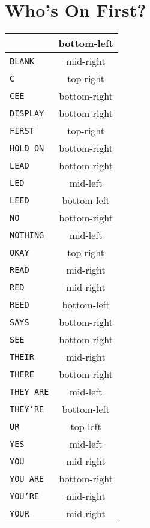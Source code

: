 \documentclass[11pt]{amsart}
\begin{document}
\section{Who's On First?}

\begin{tabular}{|l|c|}
\hline
\texttt{}         & bottom-left  \\ \hline
\texttt{BLANK}    & mid-right    \\ \hline
\texttt{C}        & top-right    \\ \hline
\texttt{CEE}      & bottom-right \\ \hline
\texttt{DISPLAY}  & bottom-right \\ \hline
\texttt{FIRST}    & top-right    \\ \hline
\texttt{HOLD ON}  & bottom-right \\ \hline
\texttt{LEAD}     & bottom-right \\ \hline
\texttt{LED}      & mid-left     \\ \hline
\texttt{LEED}     & bottom-left  \\ \hline
\texttt{NO}       & bottom-right \\ \hline
\texttt{NOTHING}  & mid-left     \\ \hline
\texttt{OKAY}     & top-right    \\ \hline
\texttt{READ}     & mid-right    \\ \hline
\texttt{RED}      & mid-right    \\ \hline
\texttt{REED}     & bottom-left  \\ \hline
\texttt{SAYS}     & bottom-right \\ \hline
\texttt{SEE}      & bottom-right \\ \hline
\texttt{THEIR}    & mid-right    \\ \hline
\texttt{THERE}    & bottom-right \\ \hline
\texttt{THEY ARE} & mid-left     \\ \hline
\texttt{THEY'RE}  & bottom-left  \\ \hline
\texttt{UR}       & top-left     \\ \hline
\texttt{YES}      & mid-left     \\ \hline
\texttt{YOU}      & mid-right    \\ \hline
\texttt{YOU ARE}  & bottom-right \\ \hline
\texttt{YOU'RE}   & mid-right    \\ \hline
\texttt{YOUR}     & mid-right    \\ \hline
\end{tabular}
\end{document}
